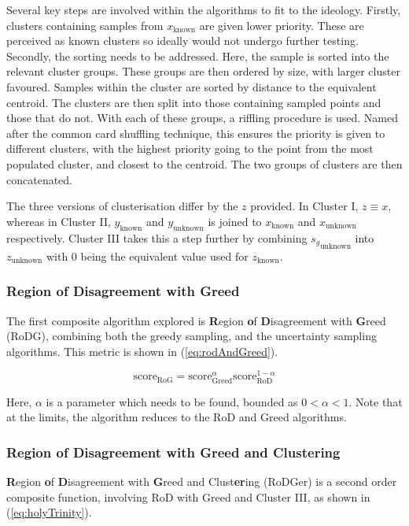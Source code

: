 Several key steps are involved within the algorithms to fit to the ideology. Firstly, clusters containing samples from $x_\mathrm{known}$ are given lower priority. These are perceived as known clusters so ideally would not undergo further testing. Secondly, the sorting needs to be addressed. Here, the sample is sorted into the relevant cluster groups. These groups are then ordered by size, with larger cluster favoured. Samples within the cluster are sorted by distance to the equivalent centroid. The clusters are then split into those containing sampled points and those that do not. With each of these groups, a riffling procedure is used. Named after the common card shuffling technique, this ensures the priority is given to different clusters, with the highest priority going to the point from the most populated cluster, and closest to the centroid. The two groups of clusters are then concatenated.

The three versions of clusterisation differ by the $z$ provided. In Cluster I, $z\equiv{}x$, whereas in Cluster II, $y_\mathrm{known}$ and $y_\mathrm{unknown}$ is joined to $x_\mathrm{known}$ and $x_\mathrm{unknown}$ respectively. Cluster III takes this a step further by combining ${s_g}_\mathrm{unknown}$ into $z_\mathrm{unknown}$ with 0 being the equivalent value used for $z_\mathrm{known}$.

\subsubsection{Region of Disagreement with Greed}
The first composite algorithm explored is \textbf{R}egion \textbf{o}f \textbf{D}isagreement with \textbf{G}reed (RoDG), combining both the greedy sampling, and the uncertainty sampling algorithms. This metric is shown in (\ref{eq:rodAndGreed}).

\begin{equation}
    \label{eq:rodAndGreed}
    {\mathrm{score}_\mathrm{RoG}=\mathrm{score}_\mathrm{Greed}^{\alpha}\mathrm{score}_\mathrm{RoD}^{1-\alpha}}
\end{equation}

Here, $\alpha$ is a parameter which needs to be found, bounded as $0<\alpha{}<1$. Note that at the limits, the algorithm reduces to the RoD and Greed algorithms.

\subsubsection{Region of Disagreement with Greed and Clustering}
\textbf{R}egion \textbf{o}f \textbf{D}isagreement with \textbf{G}reed and Clust\textbf{er}ing (RoDGer) is a second order composite function, involving RoD with Greed and Cluster III, as shown in (\ref{eq:holyTrinity}).

